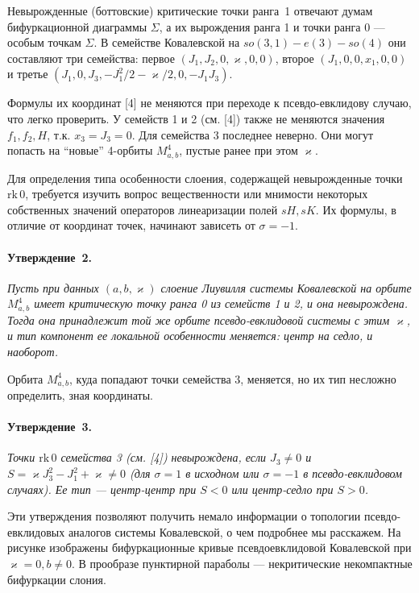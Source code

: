 Невырожденные (боттовские) критические точки ранга~1 отвечают думам бифуркационной диаграммы $\Sigma$, а их вырождения ранга 1 и точки ранга 0 --- особым точкам $\Sigma$. В семействе Ковалевской на $so(3,1)-e(3)-so(4)$ они составляют три семейства: первое $(J_1, J_2, 0, \varkappa, 0 , 0)$, второе $(J_1, 0, 0, x_1, 0 , 0)$ и третье $(J_1, 0, J_3, -J_1^2/2 -\varkappa/2, 0 , -J_1 J_3)$.

Формулы их координат [4] не меняются при переходе к псевдо-евклидову случаю, что легко проверить. У семейств 1 и 2 (см. [4]) также не меняются значения $f_1, f_2, H$, т.к. $x_3 = J_3 = 0$. Для семейства $3$ последнее неверно. Они могут попасть на ``новые'' 4-орбиты $M^4_{a, b}$, пустые ранее при этом $\varkappa$.

Для определения типа особенности слоения, содержащей невырожденные точки $\mathrm{rk}\,0$, требуется изучить вопрос вещественности или мнимости некоторых собственных значений операторов линеаризации полей $sH, sK$. Их формулы, в отличие от координат точек, начинают зависеть от $\sigma = -1$.

\paragraph{Утверждение~2.}
{\it
	Пусть при данных $(a, b, \varkappa)$ слоение Лиувилля системы Ковалевской на орбите $M^4_{a, b}$ имеет критическую точку ранга 0 из семейств 1 и 2, и она невырождена. Тогда она принадлежит той же орбите псевдо-евклидовой системы с этим $\varkappa$, и тип компонент ее локальной особенности меняется: центр на седло, и наоборот.
}

Орбита $M^4_{a, b}$, куда попадают точки семейства 3, меняется, но их тип несложно определить, зная координаты.

\paragraph{Утверждение~3.}
{\it
	Точки $\mathrm{rk}\,0$ семейства 3 (см. [4]) невырождена, если $J_3 \ne 0$ и $S = \varkappa J_3^2 - J_1^2 + \varkappa \ne 0$ (для $\sigma = 1$ в исходном или $\sigma = -1$ в псевдо-евклидовом случаях). Ее тип --- центр-центр при $S<0$ или центр-седло при $S >0$.
}

Эти утверждения позволяют получить немало информации о топологии псевдо-евклидовых аналогов системы Ковалевской, о чем подробнее мы расскажем. На рисунке изображены бифуркационные кривые псевдоевклидовой Ковалевской при $\varkappa = 0, b \ne 0$. В прообразе пунктирной параболы --- некритические некомпактные бифуркации слония.

